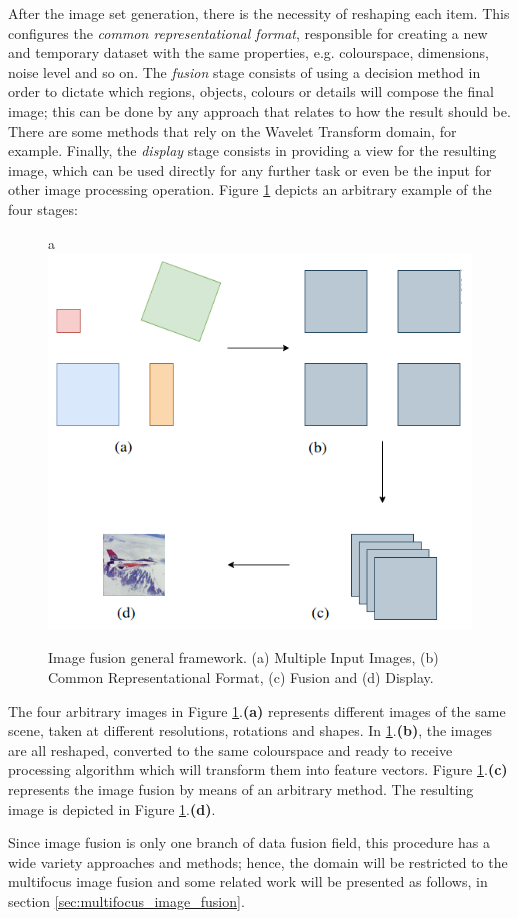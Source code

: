 After the image set generation, there is the necessity of reshaping each item. This configures the \emph{common representational format}, responsible for creating a new and temporary dataset with the same properties, e.g. colourspace, dimensions, noise level and so on. The \emph{fusion} stage consists of using a decision method in order to dictate which regions, objects, colours or details will compose the final image; this can be done by any approach that relates to how the result should be. There are some methods that rely on the Wavelet Transform domain, for example. Finally, the \emph{display} stage consists in providing a view for the resulting image, which can be used directly for any further task or even be the input for other image processing operation. Figure \ref{fig:fusion_general_framework} depicts an arbitrary example of the four stages:

\begin{figure}[H]
	\centering
	\caption{\label{fig:fusion_general_framework}Image fusion general framework. (a) Multiple Input Images, (b) Common Representational Format, (c) Fusion and (d) Display.}
	\begin{center}
a 	    \includegraphics[scale=0.4]{images/fig10.png}
	\end{center}
	\centering
    \fautor
\end{figure}

The four arbitrary images in Figure \ref{fig:fusion_general_framework}.\textbf{(a)} represents different images of the same scene, taken at different resolutions, rotations and shapes. In \ref{fig:fusion_general_framework}.\textbf{(b)}, the images are all reshaped, converted to the same colourspace and ready to receive processing algorithm which will transform them into feature vectors. Figure \ref{fig:fusion_general_framework}.\textbf{(c)} represents the image fusion by means of an arbitrary method. The resulting image is depicted in Figure \ref{fig:fusion_general_framework}.\textbf{(d)}.

Since image fusion is only one branch of data fusion field, this procedure has a wide variety approaches and methods; hence, the domain will be restricted to the multifocus image fusion and some related work will be presented as follows, in section \ref{sec:multifocus_image_fusion}.
